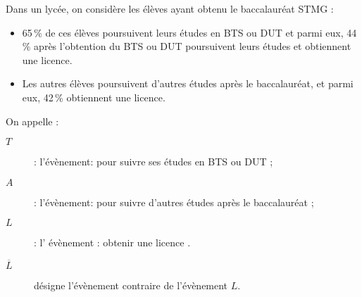 \documentclass[12pt,%
addpoints,%
]{exam}
\def\Question{	
	\renewcommand*{\questionlabel}{\fbox{Exercice \thequestion : }}
	\question
}
\def\Part{
	\renewcommand*{\partlabel}{\fbox{\thepartno : }}
	\part
}
\begin{document}
	\begin{questions}
    
        \Question 
			\begin{description}
				\item Dans un lycée, on considère les élèves ayant obtenu le baccalauréat STMG :
					\setlength\parindent{9mm}
					\begin{itemize}[label=\textbullet]
						\item 65\,\% de ces élèves poursuivent leurs études en BTS ou DUT et parmi eux, 44\,\% après l'obtention du BTS ou DUT poursuivent leurs études et obtiennent une licence.
						\item Les autres élèves poursuivent d'autres études après le baccalauréat, et parmi eux, 42\,\% obtiennent une licence.
					\end{itemize}
					\setlength\parindent{0mm}
					On appelle :			
					\begin{description}
						\item[$T$] : l'évènement: \og pour suivre ses études en BTS ou DUT\fg{} ;
						\item[$A$] : l'évènement: \og pour suivre d'autres études après le baccalauréat\fg{} ; 
						\item[$L$] : l' évènement : \og obtenir une licence \fg.
						\item[$\overline{L}$]  désigne l'évènement contraire de l'évènement $L$.
					\end{description}
			\end{description}
			\vspace{0.25cm}
\end{questions}
\end{document}
